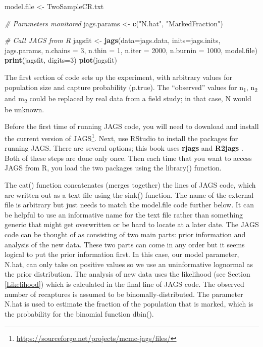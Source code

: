 \documentclass[
]{krantz}
\makeatletter
\newenvironment{Shaded}{\begin{snugshade}}{\end{snugshade}}
\newcommand{\AttributeTok}[1]{\textcolor[rgb]{0.27,0.27,0.27}{#1}}
\newcommand{\CommentTok}[1]{\textcolor[rgb]{0.37,0.37,0.37}{\textit{#1}}}
\newcommand{\DecValTok}[1]{\textcolor[rgb]{0.06,0.06,0.06}{#1}}
\newcommand{\FunctionTok}[1]{\textcolor[rgb]{0.27,0.27,0.27}{\textbf{#1}}}
\newcommand{\NormalTok}[1]{#1}
\newcommand{\OtherTok}[1]{\textcolor[rgb]{0.37,0.37,0.37}{#1}}
\newcommand{\StringTok}[1]{\textcolor[rgb]{0.5,0.5,0.5}{#1}}
\renewcommand{\href}[2]{#2\footnote{\url{#1}}}
\newenvironment{kframe}{%
\medskip{}
\setlength{\fboxsep}{.8em}
 \def\at@end@of@kframe{}%
 \ifinner\ifhmode%
  \def\at@end@of@kframe{\end{minipage}}%
  \begin{minipage}{\columnwidth}%
 \fi\fi%
 \def\FrameCommand##1{\hskip\@totalleftmargin \hskip-\fboxsep
 \colorbox{shadecolor}{##1}\hskip-\fboxsep
     \hskip-\linewidth \hskip-\@totalleftmargin \hskip\columnwidth}%
 \MakeFramed {\advance\hsize-\width
   \@totalleftmargin\z@ \linewidth\hsize
   \@setminipage}}%
 {\par\unskip\endMakeFramed%
 \at@end@of@kframe}
\renewenvironment{Shaded}{\begin{kframe}}{\end{kframe}}
\makeatother
\begin{document}
\begin{Shaded}
\begin{Highlighting}[]
\NormalTok{model.file }\OtherTok{\textless{}{-}} \StringTok{\textquotesingle{}TwoSampleCR.txt\textquotesingle{}}

\CommentTok{\# Parameters monitored}
\NormalTok{jags.params }\OtherTok{\textless{}{-}} \FunctionTok{c}\NormalTok{(}\StringTok{"N.hat"}\NormalTok{, }\StringTok{"MarkedFraction"}\NormalTok{)}

\CommentTok{\# Call JAGS from R}
\NormalTok{jagsfit }\OtherTok{\textless{}{-}} \FunctionTok{jags}\NormalTok{(}\AttributeTok{data=}\NormalTok{jags.data, }\AttributeTok{inits=}\NormalTok{jags.inits, jags.params,}
                \AttributeTok{n.chains =} \DecValTok{3}\NormalTok{, }\AttributeTok{n.thin =} \DecValTok{1}\NormalTok{, }\AttributeTok{n.iter =} \DecValTok{2000}\NormalTok{,}
                \AttributeTok{n.burnin =} \DecValTok{1000}\NormalTok{, model.file)}
\FunctionTok{print}\NormalTok{(jagsfit, }\AttributeTok{digits=}\DecValTok{3}\NormalTok{)}
\FunctionTok{plot}\NormalTok{(jagsfit)}
\end{Highlighting}
\end{Shaded}

The first section of code sets up the experiment, with arbitrary values for population size and capture probability (p.true). The ``observed'' values for n\textsubscript{1}, n\textsubscript{2} and m\textsubscript{2} could be replaced by real data from a field study; in that case, N would be unknown.

Before the first time of running JAGS code, you will need to download and install the current version of \href{https://sourceforge.net/projects/mcmc-jags/files/}{JAGS}. Next, use RStudio to install the packages for running JAGS. There are several options; this book uses \textbf{rjags} \citep{R-rjags} and \textbf{R2jags} \citep{R-R2jags}. Both of these steps are done only once. Then each time that you want to access JAGS from R, you load the two packages using the library() function.

The cat() function concatenates (merges together) the lines of JAGS code, which are written out as a text file using the sink() function. The name of the external file is arbitrary but just needs to match the model.file code further below. It can be helpful to use an informative name for the text file rather than something generic that might get overwritten or be hard to locate at a later date. The JAGS code can be thought of as consisting of two main parts: prior information and analysis of the new data. These two parts can come in any order but it seems logical to put the prior information first. In this case, our model parameter, N.hat, can only take on positive values so we use an uninformative lognormal \citep{mccarthy_2007} as the prior distribution. The analysis of new data uses the likelihood (see Section \ref{Likelihood}) which is calculated in the final line of JAGS code. The observed number of recaptures is assumed to be binomally-distributed. The parameter N.hat is used to estimate the fraction of the population that is marked, which is the probability for the binomial function dbin().
\end{document}
